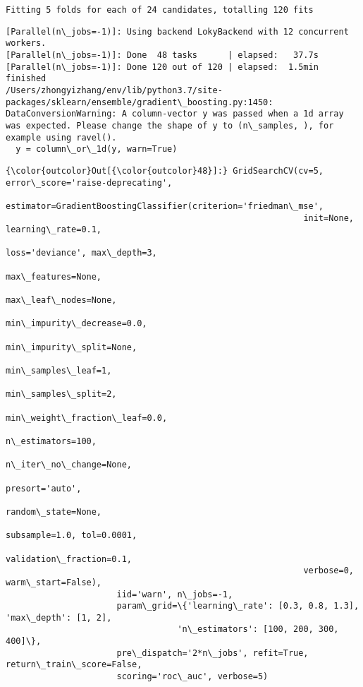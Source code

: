 \documentclass[11pt]{article}
\begin{document}
    \begin{Verbatim}[commandchars=\\\{\}]
Fitting 5 folds for each of 24 candidates, totalling 120 fits

    \end{Verbatim}

    \begin{Verbatim}[commandchars=\\\{\}]
[Parallel(n\_jobs=-1)]: Using backend LokyBackend with 12 concurrent workers.
[Parallel(n\_jobs=-1)]: Done  48 tasks      | elapsed:   37.7s
[Parallel(n\_jobs=-1)]: Done 120 out of 120 | elapsed:  1.5min finished
/Users/zhongyizhang/env/lib/python3.7/site-packages/sklearn/ensemble/gradient\_boosting.py:1450: DataConversionWarning: A column-vector y was passed when a 1d array was expected. Please change the shape of y to (n\_samples, ), for example using ravel().
  y = column\_or\_1d(y, warn=True)

    \end{Verbatim}

\begin{Verbatim}[commandchars=\\\{\}]
{\color{outcolor}Out[{\color{outcolor}48}]:} GridSearchCV(cv=5, error\_score='raise-deprecating',
                      estimator=GradientBoostingClassifier(criterion='friedman\_mse',
                                                           init=None, learning\_rate=0.1,
                                                           loss='deviance', max\_depth=3,
                                                           max\_features=None,
                                                           max\_leaf\_nodes=None,
                                                           min\_impurity\_decrease=0.0,
                                                           min\_impurity\_split=None,
                                                           min\_samples\_leaf=1,
                                                           min\_samples\_split=2,
                                                           min\_weight\_fraction\_leaf=0.0,
                                                           n\_estimators=100,
                                                           n\_iter\_no\_change=None,
                                                           presort='auto',
                                                           random\_state=None,
                                                           subsample=1.0, tol=0.0001,
                                                           validation\_fraction=0.1,
                                                           verbose=0, warm\_start=False),
                      iid='warn', n\_jobs=-1,
                      param\_grid=\{'learning\_rate': [0.3, 0.8, 1.3], 'max\_depth': [1, 2],
                                  'n\_estimators': [100, 200, 300, 400]\},
                      pre\_dispatch='2*n\_jobs', refit=True, return\_train\_score=False,
                      scoring='roc\_auc', verbose=5)
\end{Verbatim}
            
\end{document}
